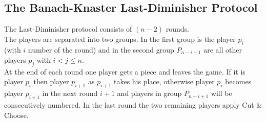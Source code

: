 \subsection{The Banach-Knaster Last-Diminisher Protocol}
The Last-Diminisher protocol consists of $(n-2)$ rounds.\\The players are separated into two groups. In the first group is the player $p_i$ (with $i$ number of the round) and in the second group $P_{n-i+1}$ are all other players $p_j$ with $i <j\leq n$.\\ At the end of each round one player gets a piece and leaves the game. If it is player $p_i$ then player $p_{i+1}$ as $p_{i+1}$ takes his place, otherwise player $p_i$ becomes player $p_{i+1}$ in the next round $i+1$ and players in group $P_{n-i+1}$ will be consecutively numbered. In the last round the two remaining players apply Cut $\&$ Choose. 

